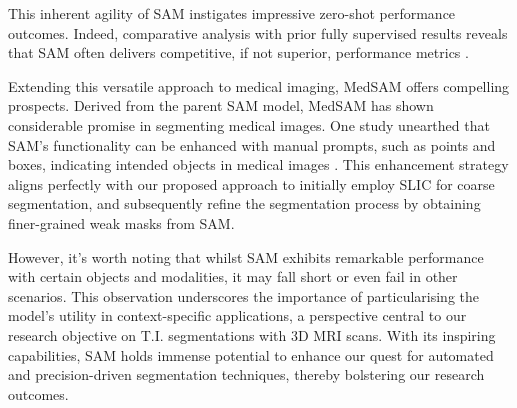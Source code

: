 This inherent agility of SAM instigates impressive zero-shot performance outcomes. Indeed, comparative analysis with prior fully supervised results reveals that SAM often delivers competitive, if not superior, performance metrics \cite{kirillov2023segany}.

Extending this versatile approach to medical imaging, MedSAM offers compelling prospects. Derived from the parent SAM model, MedSAM has shown considerable promise in segmenting medical images. One study unearthed that SAM's functionality can be enhanced with manual prompts, such as points and boxes, indicating intended objects in medical images \cite{huang2023segment}. This enhancement strategy aligns perfectly with our proposed approach to initially employ SLIC for coarse segmentation, and subsequently refine the segmentation process by obtaining finer-grained weak masks from SAM.

However, it's worth noting that whilst SAM exhibits remarkable performance with certain objects and modalities, it may fall short or even fail in other scenarios. This observation underscores the importance of particularising the model's utility in context-specific applications, a perspective central to our research objective on T.I. segmentations with 3D MRI scans. With its inspiring capabilities, SAM holds immense potential to enhance our quest for automated and precision-driven segmentation techniques, thereby bolstering our research outcomes.












